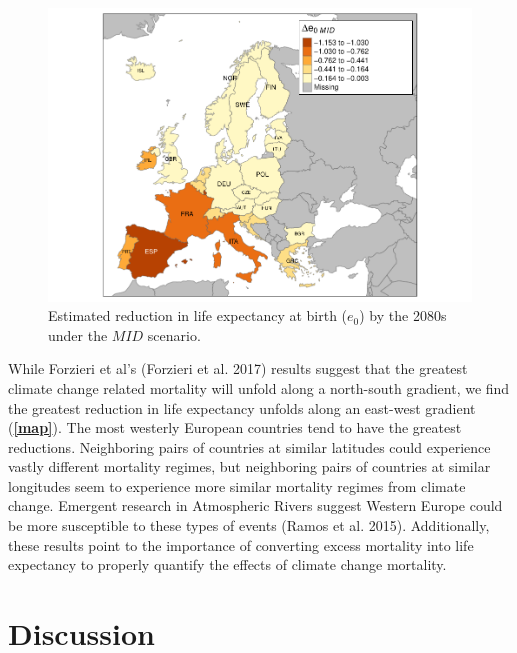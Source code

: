 \documentclass[12pt,]{article}
\makeatletter
\def\maxwidth{\ifdim\Gin@nat@width>\linewidth\linewidth
\else\Gin@nat@width\fi}
\let\Oldincludegraphics\includegraphics
\renewcommand{\includegraphics}[1]{\Oldincludegraphics[width=\maxwidth]{#1}}
\makeatother
\begin{document}
\begin{figure}
\centering
\includegraphics{MS-cclifeexpec_files/figure-latex/figure2-1.pdf}
\caption{Estimated reduction in life expectancy at birth (\(e_0\)) by
the 2080s under the \(MID\) scenario.\label{map}}
\end{figure}

While Forzieri et al's (Forzieri et al. 2017) results suggest that the
greatest climate change related mortality will unfold along a
north-south gradient, we find the greatest reduction in life expectancy
unfolds along an east-west gradient (\textbf{\autoref{map}}). The most
westerly European countries tend to have the greatest reductions.
Neighboring pairs of countries at similar latitudes could experience
vastly different mortality regimes, but neighboring pairs of countries
at similar longitudes seem to experience more similar mortality regimes
from climate change. Emergent research in Atmospheric Rivers suggest
Western Europe could be more susceptible to these types of events (Ramos
et al. 2015). Additionally, these results point to the importance of
converting excess mortality into life expectancy to properly quantify
the effects of climate change mortality.

\hypertarget{discussion}{%
\section{Discussion}\label{discussion}}
\end{document}
